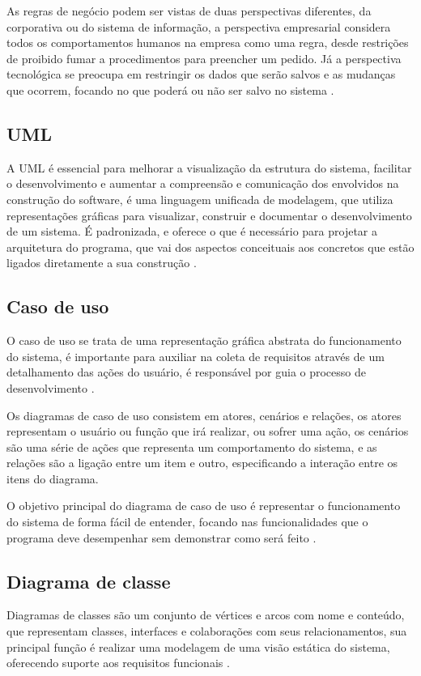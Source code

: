         As regras de negócio podem ser vistas de duas perspectivas diferentes, da corporativa ou do sistema de informação, a perspectiva empresarial considera todos os comportamentos humanos na empresa como uma regra, desde restrições de proibido fumar a procedimentos para preencher um pedido. Já a perspectiva tecnológica se preocupa em restringir os dados que serão salvos e as mudanças que ocorrem, focando no que poderá ou não ser salvo no sistema \cite[p.~5]{the_business_rules_group_guide_2000}.
    
    
    \subsection{UML}
        A UML é essencial para melhorar a visualização da estrutura do sistema, facilitar o desenvolvimento e aumentar a compreensão e comunicação dos envolvidos na construção do software, é uma linguagem unificada de modelagem, que utiliza representações gráficas para visualizar, construir e documentar o desenvolvimento de um sistema. É padronizada, e oferece o que é necessário para projetar a arquitetura do programa, que vai dos aspectos conceituais aos concretos que estão ligados diretamente a sua construção \cite{booch_uml:_2006}.
    
    
    \subsection{Caso de uso}
        O caso de uso se trata de uma representação gráfica abstrata do funcionamento do sistema, é importante para auxiliar na coleta de requisitos através de um detalhamento das ações do usuário, é responsável por guia o processo de desenvolvimento \cite[p.~145]{videira_and_silva}.

        Os diagramas de caso de uso consistem em atores, cenários e relações, os atores representam o usuário ou função que irá realizar, ou sofrer uma ação, os cenários são uma série de ações que representa um comportamento do sistema, e as relações são a ligação entre um item e outro, especificando a interação entre os itens do diagrama.
        
        O objetivo principal do diagrama de caso de uso é representar o funcionamento do sistema de forma fácil de entender, focando nas funcionalidades que o programa deve desempenhar sem demonstrar como será feito \cite[p.~146]{videira_and_silva}.
        
    
    \subsection{Diagrama de classe}
        Diagramas de classes são um conjunto de vértices e arcos com nome e conteúdo, que representam classes, interfaces e colaborações com seus relacionamentos, sua principal função é realizar uma modelagem de uma visão estática do sistema, oferecendo suporte aos requisitos funcionais \cite[p.~109]{booch_uml:_2006}.

